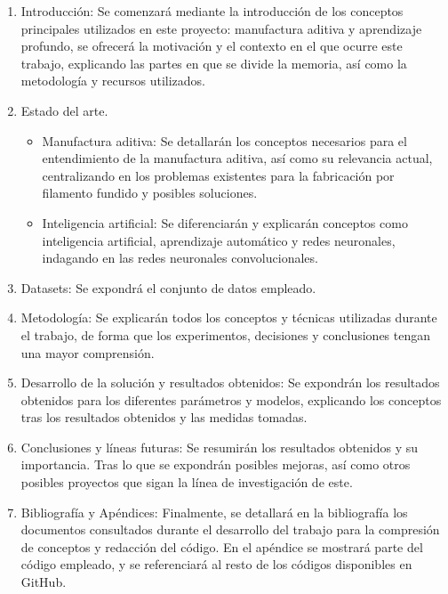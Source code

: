\documentclass{report}
\begin{document}
\begin{enumerate}
    \item Introducción: Se comenzará mediante la introducción de los conceptos principales utilizados en este proyecto: manufactura aditiva y aprendizaje profundo, se ofrecerá la motivación y el contexto en el que ocurre este trabajo, explicando las partes en que se divide la memoria, así como la metodología y recursos utilizados.
    \item Estado del arte. 
    \begin{itemize}
        \item  Manufactura aditiva: Se detallarán los conceptos necesarios para el entendimiento de la manufactura aditiva, así como su relevancia actual, centralizando en los problemas existentes para la fabricación por filamento fundido y posibles soluciones.
        \item Inteligencia artificial: Se diferenciarán y explicarán conceptos como inteligencia artificial, aprendizaje automático y redes neuronales, indagando en las redes neuronales convolucionales.
    \end{itemize}  
    \item Datasets: Se expondrá el conjunto de datos empleado.
    \item Metodología: Se explicarán todos los conceptos y técnicas utilizadas durante el trabajo, de forma que los experimentos, decisiones y conclusiones tengan una mayor comprensión.
    \item Desarrollo de la solución y resultados obtenidos: Se expondrán los resultados obtenidos para los diferentes parámetros y modelos, explicando los conceptos tras los resultados obtenidos y las medidas tomadas.
    \item Conclusiones y líneas futuras: Se resumirán los resultados obtenidos y su importancia. Tras lo que se expondrán posibles mejoras, así como otros posibles proyectos que sigan la línea de investigación de este.
    \item Bibliografía y Apéndices: Finalmente, se detallará en la bibliografía los documentos consultados durante el desarrollo del trabajo para la compresión de conceptos y redacción del código. En el apéndice se mostrará parte del código empleado, y se referenciará al resto de los códigos disponibles en GitHub.
\end{enumerate}
\end{document}

